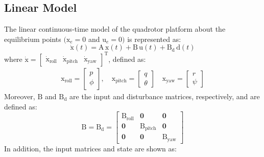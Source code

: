 \documentclass[preprint,12pt,authoryear]{elsarticle}
\begin{document}
\subsection{Linear Model}
\noindent The linear continuous-time model of the quadrotor platform about the equilibrium points $(\boldsymbol{{\mathrm{x}}}_e\!=\!0$ and $\boldsymbol{{\mathrm{u}}}_e\!=\!0)$ is represented as:
\begin{equation}\label{eq:linear}
	\boldsymbol{\dot{\mathrm{x}}}(t) = \boldsymbol{\mathrm{A\,x}}(t) + \boldsymbol{\mathrm{B\,u}}(t) + \boldsymbol{\mathrm{B_{d}\,d}}(t)
\end{equation}
where $\boldsymbol{\dot{\mathrm{x}}} = \begin{bmatrix}
				\boldsymbol{{\mathrm{\dot x_{\text{roll}}}}}&
				\boldsymbol{{\mathrm{\dot x_{\text{pitch}}}}}&
				\boldsymbol{{\mathrm{\dot x_{\text{yaw}}}}}
\end{bmatrix}^{\mathrm{T}}$, defined as:
\begin{equation}
	\begin{split}
		\boldsymbol{\mathrm{x}}_{\text{roll}} = \begin{bmatrix}
			p \\ \phi
		\end{bmatrix}, \quad
		\boldsymbol{\mathrm{x}}_{\text{pitch}} = \begin{bmatrix}
			q \\ \theta \end{bmatrix} \quad
		\boldsymbol{\mathrm{x}}_{\text{yaw}} = 
		\begin{bmatrix}
			r \\ \psi
		\end{bmatrix}
	\end{split}
\end{equation}
Moreover, $\boldsymbol{\mathrm{B}}$ and $\boldsymbol{\mathrm{B_d}}$ are the input and disturbance matrices, respectively, and are defined as:
\begin{equation}
	\boldsymbol{\mathrm{B}} = \boldsymbol{\mathrm{B_d}} = 
	\begin{bmatrix}
		\boldsymbol{{\mathrm{B_{\text{roll}}}}} & \boldsymbol{0} & \boldsymbol{0}\\
		\boldsymbol{0} & \boldsymbol{{\mathrm{B_{\text{pitch}}}}} & \boldsymbol{0} \\
		\boldsymbol{0} & \boldsymbol{0} & \boldsymbol{{\mathrm{B_{\text{yaw}}}}}
	\end{bmatrix}
\end{equation}
In addition, the input matrices and state are shown as:
\end{document}
